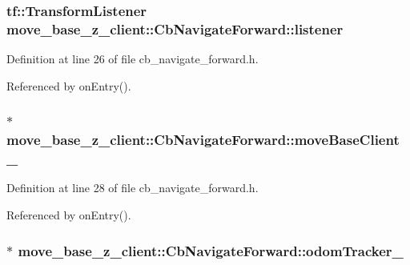 \subsubsection[{\texorpdfstring{listener}{listener}}]{\setlength{\rightskip}{0pt plus 5cm}tf\+::\+Transform\+Listener move\+\_\+base\+\_\+z\+\_\+client\+::\+Cb\+Navigate\+Forward\+::listener}\hypertarget{classmove__base__z__client_1_1CbNavigateForward_afa40fd805d66eb09e9b4b1bd8356b2a5}{}\label{classmove__base__z__client_1_1CbNavigateForward_afa40fd805d66eb09e9b4b1bd8356b2a5}


Definition at line 26 of file cb\+\_\+navigate\+\_\+forward.\+h.



Referenced by on\+Entry().

\subsubsection[{\texorpdfstring{move\+Base\+Client\+\_\+}{moveBaseClient_}}]{$\ast$ move\+\_\+base\+\_\+z\+\_\+client\+::\+Cb\+Navigate\+Forward\+::move\+Base\+Client\+\_\+}\hypertarget{classmove__base__z__client_1_1CbNavigateForward_ab3b4592cd7f30b490a0549f2ee67c389}{}\label{classmove__base__z__client_1_1CbNavigateForward_ab3b4592cd7f30b490a0549f2ee67c389}


Definition at line 28 of file cb\+\_\+navigate\+\_\+forward.\+h.



Referenced by on\+Entry().

\subsubsection[{\texorpdfstring{odom\+Tracker\+\_\+}{odomTracker_}}]{$\ast$ move\+\_\+base\+\_\+z\+\_\+client\+::\+Cb\+Navigate\+Forward\+::odom\+Tracker\+\_\+}\hypertarget{classmove__base__z__client_1_1CbNavigateForward_a1472ca04aac37644667e8833668a5bab}{}\label{classmove__base__z__client_1_1CbNavigateForward_a1472ca04aac37644667e8833668a5bab}


